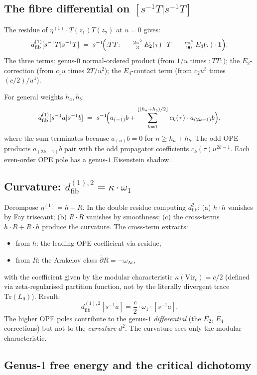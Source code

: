 \documentclass[11pt]{article}
\newcommand{\dfib}{d_{\mathrm{fib}}}
\begin{document}
\subsection*{The fibre differential on $[s^{-1}T|s^{-1}T]$}

The residue of $\eta^{(1)}\cdot T(z_1)T(z_2)$ at $u = 0$ gives:
\[
\dfib^{(1)}[s^{-1}T|s^{-1}T]
\;=\;
s^{-1}\!\Bigl(
  {:}TT{:}
  \;-\; \tfrac{2\pi^2}{3}\,E_2(\tau)\cdot T
  \;-\; \tfrac{c\pi^4}{90}\,E_4(\tau)\cdot\mathbf{1}
\Bigr).
\]
The three terms: genus-$0$ normal-ordered product (from $1/u$ times
${:}TT{:}$); the $E_2$-correction (from $c_1 u$ times $2T/u^2$);
the $E_4$-contact term (from $c_2 u^3$ times $(c/2)/u^4$).

For general weights $h_a, h_b$:
\[
\dfib^{(1)}[s^{-1}a|s^{-1}b]
\;=\;
s^{-1}\!\Bigl(
  a_{(-1)}b
  + \sum_{k=1}^{\lfloor(h_a+h_b)/2\rfloor}
    c_k(\tau)\cdot a_{(2k-1)}b
\Bigr),
\]
where the sum terminates because $a_{(n)}b = 0$ for
$n \ge h_a + h_b$.  The odd OPE products $a_{(2k-1)}b$
pair with the odd propagator coefficients $c_k(\tau)u^{2k-1}$.
Each even-order OPE pole has a genus-$1$ Eisenstein shadow.

\subsection*{Curvature: $\dfib^{(1),2} = \kappa\cdot\omega_1$}

Decompose $\eta^{(1)} = h + R$.  In the double residue computing
$\dfib^2$: (a) $h\cdot h$ vanishes by Fay trisecant; (b) $R\cdot R$
vanishes by smoothness; (c) the cross-terms $h\cdot R + R\cdot h$
produce the curvature.  The cross-term extracts:
\begin{itemize}
\item from $h$: the leading OPE coefficient via residue,
\item from $R$: the Arakelov class $\bar\partial R
  = -\omega_{\mathrm{Ar}}$,
\end{itemize}
with the coefficient given by the modular characteristic
$\kappa(\mathrm{Vir}_c) = c/2$
(defined via zeta-regularised partition function, not by the
literally divergent trace $\mathrm{Tr}(L_0)$).  Result:
\[
\dfib^{(1),2}[s^{-1}a]
= \frac{c}{2}\cdot\omega_1\cdot [s^{-1}a].
\]
The higher OPE poles contribute to the genus-$1$ \emph{differential}
(the $E_2$, $E_4$ corrections) but not to the \emph{curvature}
$d^2$.  The curvature sees only the modular characteristic.

\subsection*{Genus-$1$ free energy and the critical dichotomy}
\end{document}

